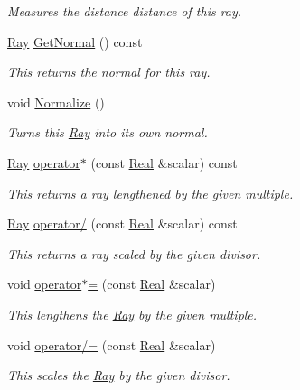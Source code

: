 \begin{DoxyCompactItemize}
\begin{DoxyCompactList}\small\item\em Measures the distance distance of this ray. \item\end{DoxyCompactList}\item 
\hyperlink{classphys_1_1Ray}{Ray} \hyperlink{classphys_1_1Ray_a7445c25acb6ce865ef85e7ada829ccba}{GetNormal} () const 
\begin{DoxyCompactList}\small\item\em This returns the normal for this ray. \item\end{DoxyCompactList}\item 
void \hyperlink{classphys_1_1Ray_a2acbaef60718001a048db26ccaaef787}{Normalize} ()
\begin{DoxyCompactList}\small\item\em Turns this \hyperlink{classphys_1_1Ray}{Ray} into its own normal. \item\end{DoxyCompactList}\item 
\hyperlink{classphys_1_1Ray}{Ray} \hyperlink{classphys_1_1Ray_a6a47611776a9ab83d7ebc178a8d35b50}{operator$\ast$} (const \hyperlink{namespacephys_af7eb897198d265b8e868f45240230d5f}{Real} \&scalar) const 
\begin{DoxyCompactList}\small\item\em This returns a ray lengthened by the given multiple. \item\end{DoxyCompactList}\item 
\hyperlink{classphys_1_1Ray}{Ray} \hyperlink{classphys_1_1Ray_a126f8e4db94cccb5c0040db29c771a47}{operator/} (const \hyperlink{namespacephys_af7eb897198d265b8e868f45240230d5f}{Real} \&scalar) const 
\begin{DoxyCompactList}\small\item\em This returns a ray scaled by the given divisor. \item\end{DoxyCompactList}\item 
void \hyperlink{classphys_1_1Ray_acc1ac010f02f61b3d5234a5b619e926a}{operator$\ast$=} (const \hyperlink{namespacephys_af7eb897198d265b8e868f45240230d5f}{Real} \&scalar)
\begin{DoxyCompactList}\small\item\em This lengthens the \hyperlink{classphys_1_1Ray}{Ray} by the given multiple. \item\end{DoxyCompactList}\item 
void \hyperlink{classphys_1_1Ray_a11f681152a5a39c36f2b398d44657ecd}{operator/=} (const \hyperlink{namespacephys_af7eb897198d265b8e868f45240230d5f}{Real} \&scalar)
\begin{DoxyCompactList}\small\item\em This scales the \hyperlink{classphys_1_1Ray}{Ray} by the given divisor. \item\end{DoxyCompactList}\end{DoxyCompactItemize}
